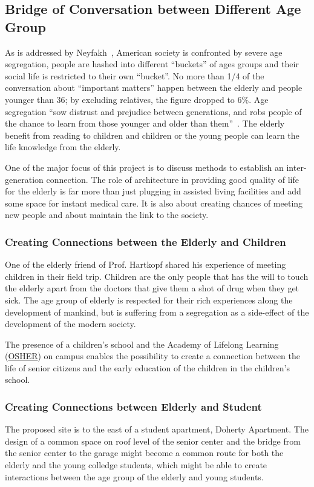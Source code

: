 \subsection{Bridge of Conversation between Different Age Group}
As is addressed by Neyfakh~\cite{Neyfakh2014}, American society is
confronted by severe age segregation, people are hashed into different
``buckets'' of ages groups and their social life is restricted to
their own ``bucket''. No more than 1/4 of the conversation about
``important matters'' happen between the elderly and people younger
than 36; by excluding relatives, the figure dropped to 6\%. Age
segregation ``sow distrust and prejudice between generations, and robs
people of the chance to learn from those younger and older than
them''~\cite{Neyfakh2014}.  The elderly benefit from reading to
children and children or the young people can learn the life knowledge
from the elderly.

One of the major focus of this project is to discuss methods to
establish an inter-generation connection. The role of architecture in
providing good quality of life for the elderly is far more than just
plugging in assisted living facilities and add some space for instant
medical care. It is also about creating chances of meeting new people
and about maintain the link to the society.

\subsubsection{Creating Connections between the Elderly and Children}
One of the elderly friend of Prof. Hartkopf shared his experience of
meeting children in their field trip. Children are the only people
that has the will to touch the elderly apart from the doctors that
give them a shot of drug when they get sick. The age group of elderly
is respected for their rich experiences along the development of
mankind, but is suffering from a segregation as a side-effect of the
development of the modern society.

The presence of a children’s school and the Academy of Lifelong
Learning (\href{http://www.cmu.edu/osher/}{OSHER}) on campus enables
the possibility to create a connection between the life of senior
citizens and the early education of the children in the children's
school.

\subsubsection{Creating Connections between Elderly and Student}
The proposed site is to the east of a student apartment, Doherty
Apartment. The design of a common space on roof level of the senior
center and the bridge from the senior center to the garage might
become a common route for both the elderly and the young colledge
students, which might be able to create interactions between the age
group of the elderly and young students.


